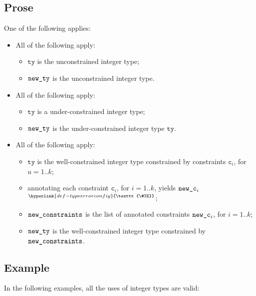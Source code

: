 \documentclass{book}
\newcommand\TypeErrorConfig[0]{\hyperlink{def-typeerrorconfig}{\texttt{\#TE}}}
\newcommand\ProseOrTypeError[0]{\hyperlink{def-proseortypeerror}{$^{\TypeErrorConfig}$}}
\newcommand\vc[0]{\texttt{c}}
\newcommand\tty[0]{\texttt{ty}}
\begin{document}
\subsection{Prose}
One of the following applies:
\begin{itemize}
  \item All of the following apply:
    \begin{itemize}
      \item $\tty$ is the unconstrained integer type;
      \item $\texttt{new\_ty}$ is the unconstrained integer type.
    \end{itemize}
  \item All of the following apply:
    \begin{itemize}
      \item $\tty$ is a under-constrained integer type;
      \item $\texttt{new\_ty}$ is the under-constrained integer type $\tty$.
    \end{itemize}
  \item All of the following apply:
    \begin{itemize}
      \item $\tty$ is the well-constrained integer type constrained by
        constraints $\vc_i$, for $u=1..k$;
      \item annotating each constraint $\vc_i$, for $i=1..k$,
      yields $\texttt{new\_c}_i$ \ProseOrTypeError;
      \item $\texttt{new\_constraints}$ is the list of annotated constraints $\texttt{new\_c}_i$,
      for $i=1..k$;
      \item $\texttt{new\_ty}$ is the well-constrained integer type constrained
        by $\texttt{new\_constraints}$.
    \end{itemize}
\end{itemize}

\subsection{Example}

In the following examples, all the uses of integer types are valid:

\end{document}
